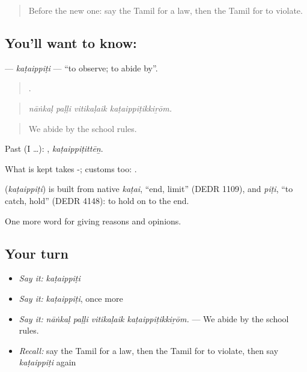 \label{lesson:TA-C372-kataippiti}



\begin{quote}
Before the new one: say the Tamil for a law, then the Tamil for to violate.
\end{quote}

\subsection*{You'll want to know: }
\textbf{} — \emph{kaṭaippiṭi} — \textquotedblleft{}to observe; to abide by\textquotedblright{}.

\begin{quote}
   .
\end{quote}

\begin{quote}
\emph{nāṅkaḷ paḷḷi vitikaḷaik kaṭaippiṭikkiṟōm.}
\end{quote}

\begin{quote}
We abide by the school rules.
\end{quote}

Past (I …): , \emph{kaṭaippiṭittēṉ}.

What is kept takes -; customs too:  .

\begin{cousinweb}
\textbf{} (\emph{kaṭaippiṭi}) is built from native \emph{kaṭai}, \textquotedblleft{}end, limit\textquotedblright{} (DEDR 1109), and \emph{piṭi}, \textquotedblleft{}to catch, hold\textquotedblright{} (DEDR 4148): to hold on to the end.
\end{cousinweb}

\begin{grammarlens}[title={What you've built}]
One more word for giving reasons and opinions.
\end{grammarlens}

\subsection*{Your turn}
\begin{itemize}
\raggedright
  \item \emph{Say it:} \emph{kaṭaippiṭi}
  \item \emph{Say it:} \emph{kaṭaippiṭi}, once more
  \item \emph{Say it:} \emph{nāṅkaḷ paḷḷi vitikaḷaik kaṭaippiṭikkiṟōm.} — We abide by the school rules.
  \item \emph{Recall:} say the Tamil for a law, then the Tamil for to violate, then say \emph{kaṭaippiṭi} again
\end{itemize}

